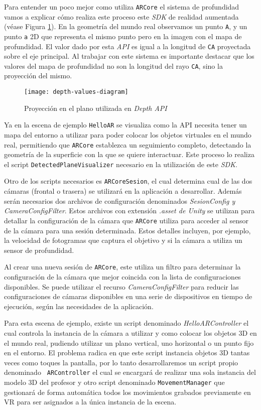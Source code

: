 Para entender un poco mejor como utiliza \texttt{ARCore} el sistema de profundidad vamos a explicar cómo realiza este proceso este \textit{SDK} de realidad aumentada (véase Figura \ref{fig:depth-values-diagram}). En la geometría del mundo real observamos un punto \texttt{A}, y un punto \texttt{a} 2D que representa el mismo punto pero en la imagen con el mapa de profundidad. El valor dado por esta \textit{API} es igual a la longitud de \texttt{CA} proyectada sobre el eje principal. Al trabajar con este sistema es importante destacar que los valores del mapa de profundidad no son la longitud del rayo \texttt{CA}, sino la proyección del mismo.

\begin{figure}[h!]
    \centering 
    \texttt{[image: depth-values-diagram]}
    \caption{Proyección en el plano utilizada en \textit{Depth API}}
    \label{fig:depth-values-diagram}
\end{figure} 

Ya en la escena de ejemplo \texttt{HelloAR} se visualiza como la API necesita tener un mapa del entorno a utilizar para poder colocar los objetos virtuales en el mundo real, permitiendo que \texttt{ARCore} establezca un seguimiento completo, detectando la geometría de la superficie con la que se quiere interactuar. Este proceso lo realiza el script \texttt{DetectedPlaneVisualizer} necesario en la utilización de este \textit{SDK}.

Otro de los scripts necesarios es \texttt{ARCoreSesion}, el cual determina cual de las dos cámaras (frontal o trasera) se utilizará en la aplicación a desarrollar. Además serán necesarios dos archivos de configuración denominados \textit{SesionConfig y CameraConfigFilter}. Estos archivos con extensión \textit{.asset de Unity} se utilizan para detallar la configuración de la cámara que \texttt{ARCore} utiliza para acceder al sensor de la cámara para una sesión determinada. Estos detalles incluyen, por ejemplo, la velocidad de fotogramas que captura el objetivo y si la cámara a utiliza un sensor de profundidad.

Al crear una nueva sesión de \texttt{ARCore}, este utiliza un filtro para determinar la configuración de la cámara que mejor coincida con la lista de configuraciones disponibles. Se puede utilizar el recurso \textit{CameraConfigFilter} para reducir las configuraciones de cámaras disponibles en una serie de dispositivos en tiempo de ejecución, según las necesidades de la aplicación.

Para esta escena de ejemplo, existe un script denominado \textit{HelloARController} el cual controla la instancia de la cámara a utilizar y como colocar los objetos 3D en el mundo real, pudiendo utilizar un plano vertical, uno horizontal o un punto fijo en el entorno. El problema radica en que este script instancia objetos 3D tantas veces como toques la pantalla, por lo tanto desarrollaremos un script propio denominado \texttt{ ARController} el cual se encargará de realizar una sola instancia del modelo 3D del profesor y otro script denominado \texttt{MovementManager} que gestionará de forma automática todos los movimientos grabados previamente en VR para ser asignados a la única instancia de la escena.

